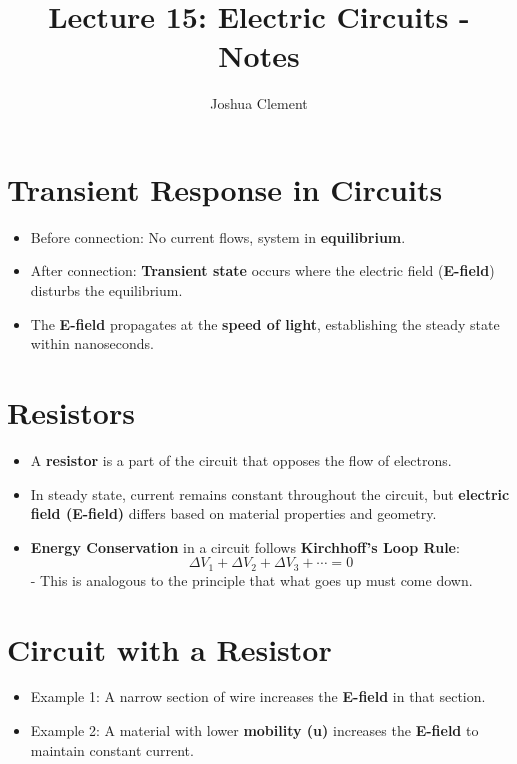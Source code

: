 \documentclass{article}
\begin{document}
\title{Lecture 15: Electric Circuits - Notes}
\author{Joshua Clement}
\maketitle

\section*{Transient Response in Circuits}
\begin{itemize}
    \item Before connection: No current flows, system in \textbf{equilibrium}.
    \item After connection: \textbf{Transient state} occurs where the electric field (\textbf{E-field}) disturbs the equilibrium.
    \item The \textbf{E-field} propagates at the \textbf{speed of light}, establishing the steady state within nanoseconds.
\end{itemize}

\section*{Resistors}
\begin{itemize}
    \item A \textbf{resistor} is a part of the circuit that opposes the flow of electrons.
    \item In steady state, current remains constant throughout the circuit, but \textbf{electric field (E-field)} differs based on material properties and geometry.
    \item \textbf{Energy Conservation} in a circuit follows \textbf{Kirchhoff’s Loop Rule}:
    \[
    \Delta V_1 + \Delta V_2 + \Delta V_3 + \cdots = 0
    \]
    - This is analogous to the principle that what goes up must come down.
\end{itemize}

\section*{Circuit with a Resistor}
\begin{itemize}
    \item Example 1: A narrow section of wire increases the \textbf{E-field} in that section.
    \item Example 2: A material with lower \textbf{mobility (u)} increases the \textbf{E-field} to maintain constant current.
\end{itemize}
\end{document}
